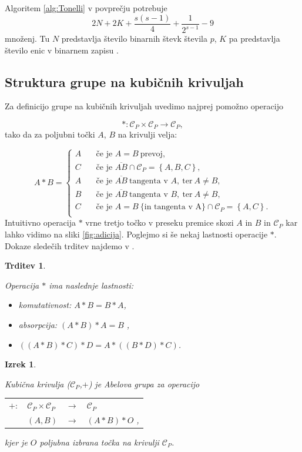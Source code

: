 \documentclass[12pt,a4paper,twoside]{article}
\theoremstyle{definition} %
\theoremstyle{plain} %
\newtheorem{izrek}[definicija]{Izrek}
\newtheorem{trditev}[definicija]{Trditev}
\numberwithin{equation}{section}  %
\begin{document}
Algoritem \ref{alg:Tonelli} v povprečju potrebuje
$$2N+2K+\frac{s(s-1)}{4}+\frac{1}{2^{s-1}}-9$$
množenj. Tu $N$ predstavlja število binarnih števk števila $p$, $K$ pa predstavlja število enic v binarnem zapisu \cite{Tornaria2002}.

\subsection{Struktura grupe na kubičnih krivuljah}


Za definicijo grupe na kubičnih krivuljah uvedimo najprej pomožno operacijo

$$\ast : \mathcal{C}_P \times \mathcal{C}_P \rightarrow \mathcal{C}_P,$$
tako da za poljubni točki $A$, $B$ na krivulji velja:

\[ A \ast B =
\begin{cases}
A & \quad \text{če je } A=B \ \text{prevoj},\\
C & \quad \text{če je } \overline{AB} \cap \mathcal{C}_P = \left\{ A,B,C \right\},\\
A & \quad \text{če je } \overline{AB} \ \text{tangenta v } A,\ \text{ter} \ A \neq B,\\
B & \quad \text{če je } \overline{AB} \ \text{tangenta v } B,\ \text{ter} \ A \neq B,\\
C &\quad \text{če je } A=B \ \{\text{in tangenta v A}\} \cap \mathcal{C}_P = \left\{ A,C \right\}.\\
\end{cases}
\]
Intuitivno operacija $\ast$ vrne tretjo točko v preseku premice skozi $A$ in $B$ in $\mathcal{C}_P$ kar lahko vidimo na sliki \ref{fig:adicija}. Poglejmo si še nekaj lastnosti operacije $\ast$. Dokaze sledečih trditev najdemo v \cite[Poglavje 17.3]{Gibson1999}.

\begin{trditev}~

\label{last zvezda}
Operacija $\ast$ ima naslednje lastnosti:

\begin{itemize}
\item komutativnost: $ A \ast B = B \ast A$,
\item absorpcija: $(A \ast B ) \ast A = B$ ,
\item $((A \ast B) \ast C ) \ast D = A \ast ((B \ast D)\ast C)$.
\end{itemize}
\end{trditev}

\begin{izrek}~

Kubična krivulja ($\mathcal{C}_P$,$+$) je Abelova grupa za operacijo

\begin{table}[ht]
\centering
\begin{tabular}{llll}
$+:$ & $\mathcal{C}_P \times \mathcal{C}_P$ & $\rightarrow$ & $\mathcal{C}_P$ \\
& $(A,B)$ & $\rightarrow$ & $(A\ast B)\ast O$ ,
\end{tabular}
\end{table}
kjer je $O$ poljubna izbrana točka na krivulji $ \mathcal{C}_P$.
\end{izrek}
\end{document}
